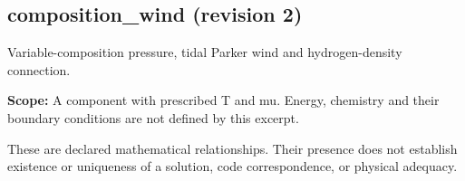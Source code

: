 \subsection*{composition\_wind (revision 2)}
Variable-composition pressure, tidal Parker wind and hydrogen-density connection.

\noindent\textbf{Scope:} A component with prescribed T and mu. Energy, chemistry and their boundary conditions are not defined by this excerpt.

These are declared mathematical relationships. Their presence does not establish
existence or uniqueness of a solution, code correspondence, or physical adequacy.

